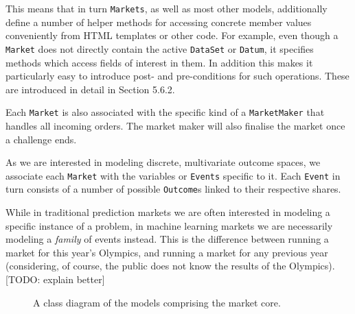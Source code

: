 \documentclass[bsc,frontabs,twoside,singlespacing,parskip,deptreport]{infthesis}     %
\begin{document}
	This means that in turn {\tt Markets}, as well as most other models, additionally define a number of helper methods for accessing concrete member values conveniently from HTML templates or other code. For example, even though a {\tt Market} does not directly contain the active {\tt DataSet} or {\tt Datum}, it specifies methods which access fields of interest in them. In addition this makes it particularly easy to introduce post- and pre-conditions for such operations. These are introduced in detail in Section 5.6.2. 


        Each {\tt Market} is also associated with the specific kind of a {\tt MarketMaker} that handles all incoming orders. The market maker will also finalise the market once a challenge ends.
    
    As we are interested in modeling discrete, multivariate outcome spaces, we associate each {\tt Market} with the variables or {\tt Events} specific to it. Each {\tt Event} in turn consists of a number of possible {\tt Outcome}s linked to their respective shares. 

    While in traditional prediction markets we are often interested in modeling a specific instance of a problem, in machine learning markets we are necessarily modeling a {\em family} of events instead. This is the difference between running a market for this year’s Olympics, and running a market for any previous year (considering, of course, the public does not know the results of the Olympics). [TODO: explain better]


\begin{figure}
\noindent{}
\label{fig:model_diagram}
\caption{A class diagram of the models comprising the market core. }
\end{figure}
\end{document}
